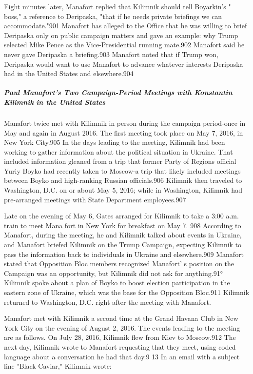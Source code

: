 Eight minutes later, Manafort replied that Kilimnik should tell Boyarkin's " boss," a reference to Deripaska, "that if he needs private briefings we can accommodate."901 Manafort has alleged to the Office that he was willing to brief Deripaska only on public campaign matters and gave an example: why Trump selected Mike Pence as the Vice-Presidential running mate.902 Manafort said he never gave Deripaska a  briefing.903 Manafort noted that if Trump won, Deripaska would want to use Manafort to advance whatever interests Deripaska had in the United States and elsewhere.904

\subparagraph{Paul Manafort's Two Campaign-Period Meetings with Konstantin Kilimnik in the United States}

Manafort twice met with Kilimnik in person during the campaign period-once in May and again in August 2016. The first meeting took place on May 7, 2016, in New York City.905 In the days leading to the meeting, Kilimnik had been working to gather information about the political situation in Ukraine. That included information gleaned from a trip that former Party of Regions official Yuriy Boyko had recently taken to Moscow-a trip that likely included meetings between Boyko and high-ranking Russian officials.906 Kilimnik then traveled to Washington, D.C. on or about May 5, 2016; while in Washington, Kilimnik had pre-arranged meetings with State Department employees.907

Late on the evening of May 6, Gates arranged for Kilimnik to take a 3:00 a.m. train to meet Mana fort in New York for breakfast on May 7. 908 According to Manafort, during the meeting, he and Kilimnik talked about events in Ukraine, and Manafort briefed Kilimnik on the Trump Campaign, expecting Kilimnik to pass the information back to individuals in Ukraine and elsewhere.909 Manafort stated that Opposition Bloc members recognized Manafort' s position on the Campaign was an opportunity, but Kilimnik did not ask for anything.91° Kilimnik spoke about a plan of Boyko to boost election participation in the eastern zone of Ukraine, which was the base for the Opposition Bloc.911 Kilimnik returned to Washington, D.C. right after the meeting with Manafort.

Manafort met with Kilimnik a  second time at the Grand Havana Club in New York City on the evening of August 2, 2016.  The events leading to the meeting are as follows. On July 28, 2016, Kilimnik flew from Kiev to Moscow.912 The next day, Kilimnik wrote to Manafort requesting that they meet, using coded language about a  conversation he had that day.9 13 In an email with a subject line "Black Caviar," Kilimnik wrote:

